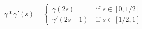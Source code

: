 \documentclass[preview]{standalone}
\begin{document}
\begin{align*}
\gamma\ast\gamma'(s) = \begin{cases}\gamma(2s) & \text{ if } s \in [0,1/2] \\ \gamma'(2s - 1) & \text{ if }s \in [1/2,1]\end{cases}
\end{align*}
\end{document}
